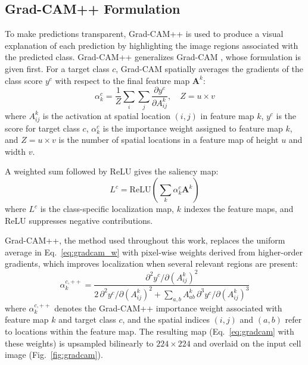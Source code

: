 \documentclass[conference]{IEEEtran}
\begin{document}
\subsection{Grad-CAM++ Formulation}

To make predictions transparent, Grad-CAM++ \cite{chattopadhay2018} is used to produce a visual explanation of each prediction by highlighting the image regions associated with the predicted class. Grad-CAM++ generalizes Grad-CAM \cite{selvaraju2017gradcam}, whose formulation is given first. For a target class $c$, Grad-CAM spatially averages the gradients of the class score $y^c$ with respect to the final feature map $\mathbf{A}^k$:
\begin{equation}
    \alpha_k^c = \frac{1}{Z}\sum_i\sum_j
    \frac{\partial y^c}{\partial A^k_{ij}}, \quad Z = u \times v
    \label{eq:gradcam_w}
\end{equation}
where $A^k_{ij}$ is the activation at spatial location $(i,j)$ in feature map $k$, $y^c$ is the score for target class $c$, $\alpha_k^c$ is the importance weight assigned to feature map $k$, and $Z=u\times v$ is the number of spatial locations in a feature map of height $u$ and width $v$.

A weighted sum followed by ReLU gives the saliency map:
\begin{equation}
    L^c = \mathrm{ReLU}\!\left(\sum_k \alpha_k^c \mathbf{A}^k\right)
    \label{eq:gradcam}
\end{equation}
where $L^c$ is the class-specific localization map, $k$ indexes the feature maps, and ReLU suppresses negative contributions.

Grad-CAM++, the method used throughout this work, replaces the uniform average in Eq.~\ref{eq:gradcam_w} with pixel-wise weights derived from higher-order gradients, which improves localization when several relevant regions are present:
\begin{equation}
    \alpha_k^{c,++} = \frac{{\partial^2 y^c}/{\partial(A^k_{ij})^2}}
    {2\,{\partial^2 y^c}/{\partial(A^k_{ij})^2}
    + \sum_{a,b} A^k_{ab}\,{\partial^3 y^c}/{\partial(A^k_{ij})^3}}
    \label{eq:gradcampp}
\end{equation}
where $\alpha_k^{c,++}$ denotes the Grad-CAM++ importance weight associated with feature map $k$ and target class $c$, and the spatial indices $(i,j)$ and $(a,b)$ refer to locations within the feature map. The resulting map (Eq.~\ref{eq:gradcam} with these weights) is upsampled bilinearly to $224 \times 224$ and overlaid on the input cell image (Fig.~\ref{fig:gradcam}).
\end{document}
